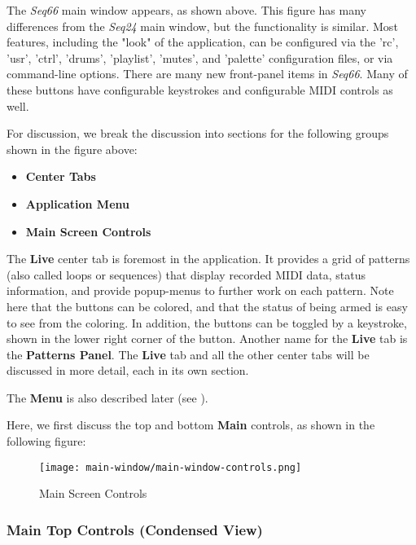 \documentclass[
 11pt,
 twoside,
 a4paper,
 headinclude,
 footinclude,
 final                                 %
]{article}
\begin{document}
   The \textsl{Seq66} main window appears, as shown above.
   This figure has many differences from the \textsl{Seq24} main window,
   but the functionality is similar.
   Most features, including the "look" of the application,
   can be configured via the 'rc', 'usr', 'ctrl', 'drums', 'playlist', 'mutes',
   and 'palette' configuration files, or via command-line options.
   There are many new front-panel items in \textsl{Seq66}.
   Many of these buttons have configurable keystrokes and configurable MIDI
   controls as well.

   For discussion, we break the discussion into sections for the following
   groups shown in the figure above:

   \begin{itemize}
      \item \textbf{Center Tabs}
      \item \textbf{Application Menu}
      \item \textbf{Main Screen Controls}
   \end{itemize}

   The \textbf{Live} center tab is foremost in the application.
   It provides a grid of patterns (also called loops or
   sequences) that display recorded MIDI data, status information, and provide
   popup-menus to further work on each pattern.  Note here that the buttons can
   be colored, and that the status of being armed is easy to see from the
   coloring.
   In addition, the buttons can be toggled by a keystroke, shown in the lower
   right corner of the button.
   Another name for the \textbf{Live} tab is the \textbf{Patterns Panel}.
   The \textbf{Live} tab and all the other center tabs
   will be discussed in more detail, each in its own section.

   The \textbf{Menu} is also described later (see ).

   Here, we first discuss the top and bottom \textbf{Main} controls, as
   shown in the following figure:

\begin{figure}[H]
   \centering 
   \texttt{[image: main-window/main-window-controls.png]}
   \caption{Main Screen Controls}
   \label{fig:main_screen_controls}
\end{figure}

\subsubsection{Main Top Controls (Condensed View)}
\label{subsubsec:introduction_main_top_controls}
\end{document}

